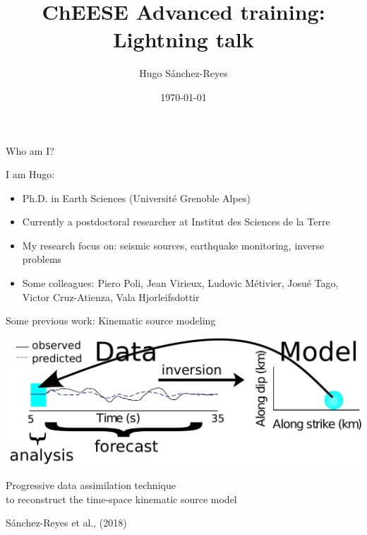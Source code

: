 \documentclass[aspectratio=43,9pt]{beamer}
\title{ChEESE Advanced training: Lightning talk}								%
\subtitle{Hugo S\'anchez-Reyes}
\date{\today}
\author{\quad}								%
\institute{ISTerre, Universit\'e Grenoble Alpes}							%
\begin{document}
\maketitle


\begin{frame}{Who am I?}

I am Hugo: \\
\vskip 0.5cm
\begin{itemize}
 \item Ph.D. in Earth Sciences (Universit\'e Grenoble Alpes) \\
 \item Currently a postdoctoral researcher at Institut des Sciences de la Terre \\
 \item My research focus on: seismic sources, earthquake monitoring, inverse problems \\
 \item Some colleagues: Piero Poli, Jean Virieux, Ludovic M\'etivier, Josu\'e Tago, Victor Cruz-Atienza, Vala Hjorleifsdottir
\end{itemize}


\end{frame}
  

\begin{frame}
 {Some previous work: Kinematic source modeling}

 \centering \includegraphics[width=1\linewidth]{Figures/model_time_space_windows_01}
 \vskip 1cm
 \begin{center}
 Progressive data assimilation technique  \\ 
 to reconstruct the time-space kinematic source model   
 \end{center}

 \hfill S\'anchez-Reyes et al., (2018)
 
\end{frame}
\end{document}
